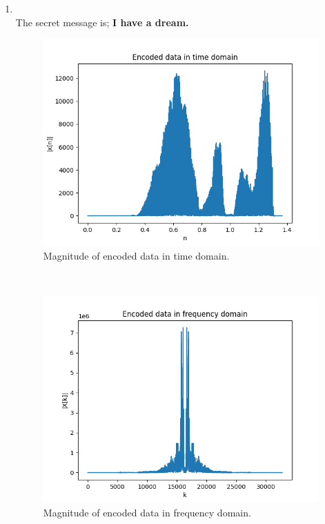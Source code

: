 \documentclass[10pt,a4paper, margin=1in]{article}
\begin{document}
\begin{enumerate}
    \item ~\\
          The secret message is; \textbf{I have a dream.}\\
          \begin{figure}[H]
            \includegraphics[scale = 0.75]{e_t}
            \caption{Magnitude of encoded data in time domain.}
          \end{figure}~\\
          \begin{figure}[H]
            \includegraphics[scale = 0.75]{e_f}
            \caption{Magnitude of encoded data in frequency domain.}
          \end{figure}~\\

\end{enumerate}
\end{document}
